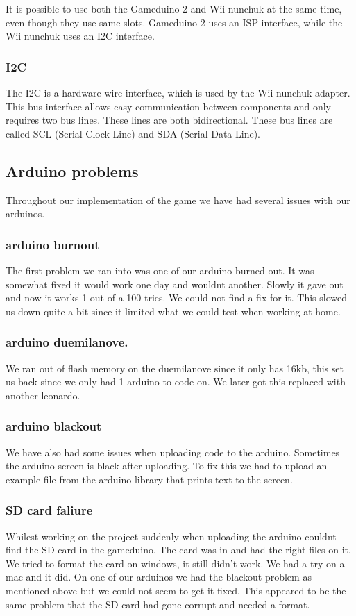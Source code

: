 It is possible to use both the Gameduino 2 and Wii
nunchuk at the same time, even though they use same slots.
Gameduino 2 uses an ISP interface, while the Wii nunchuk uses an I2C interface.


\subsubsection{I2C}
The I2C is a hardware wire interface, which is used by the Wii nunchuk adapter. This bus
interface allows easy communication between components and only requires two
bus lines. These lines are both bidirectional. These bus lines are called SCL
(Serial Clock Line) and SDA (Serial Data Line).

\subsection{Arduino problems}
Throughout our implementation of the game we have had several issues with our arduinos.

\subsubsection{arduino burnout}	
The first problem we ran into was one of our arduino burned out. It was somewhat fixed it would work one day and wouldnt another. Slowly it gave out and now it works 1 out of a 100 tries. We could not find a fix for it. This slowed us down quite a bit since it limited what we could test when working at home.
\subsubsection{arduino duemilanove.}
We ran out of flash memory on the duemilanove since it only has 16kb, this set us back since we only had 1 arduino to code on. We later got this replaced with another leonardo.
\subsubsection{arduino blackout}
We have also had some issues when uploading code to the arduino. Sometimes the arduino screen is black after uploading. To fix this we had to upload an example file from the arduino library that prints text to the screen.
\subsubsection{SD card faliure}
Whilest working on the project suddenly when uploading the arduino couldnt find the SD card in the gameduino. The card was in and had the right files on it. We tried to format the card on windows, it still didn't work. We had a try on a mac and it did.
On one of our arduinos we had the blackout problem as mentioned above but we could not seem to get it fixed. This appeared to be the same problem that the SD card had gone corrupt and needed a format.



